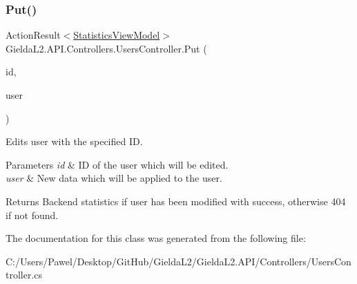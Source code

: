 \subsubsection{\texorpdfstring{Put()}{Put()}}
{\footnotesize\ttfamily Action\+Result$<$\mbox{\hyperlink{class_gielda_l2_1_1_a_p_i_1_1_view_models_1_1_view_1_1_statistics_view_model}{Statistics\+View\+Model}}$>$ Gielda\+L2.\+A\+P\+I.\+Controllers.\+Users\+Controller.\+Put (\begin{DoxyParamCaption}\item[{int}]{id,  }\item[{\mbox{[}\+From\+Body\mbox{]} \mbox{\hyperlink{class_gielda_l2_1_1_a_p_i_1_1_view_models_1_1_edit_1_1_edit_user_view_model}{Edit\+User\+View\+Model}}}]{user }\end{DoxyParamCaption})}



Edits user with the specified ID. 


\begin{DoxyParams}{Parameters}
{\em id} & ID of the user which will be edited.\\
\hline
{\em user} & New data which will be applied to the user.\\
\hline
\end{DoxyParams}
\begin{DoxyReturn}{Returns}
Backend statistics if user has been modified with success, otherwise 404 if not found.
\end{DoxyReturn}


The documentation for this class was generated from the following file\+:\begin{DoxyCompactItemize}
\item 
C\+:/\+Users/\+Pawel/\+Desktop/\+Git\+Hub/\+Gielda\+L2/\+Gielda\+L2.\+A\+P\+I/\+Controllers/Users\+Controller.\+cs\end{DoxyCompactItemize}

